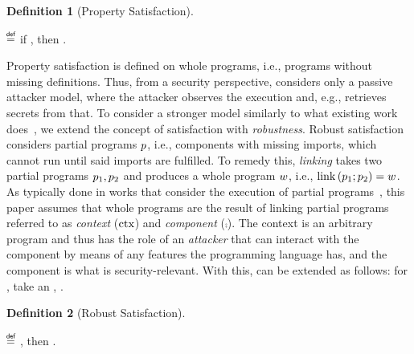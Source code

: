 \documentclass[dvipsnames,conference]{IEEEtran}
\theoremstyle{definition}
\newtheorem{definition}{Definition}[section]
\begin{document}
\begin{definition}[Property Satisfaction]\label{def:propsat}
$\;$ 

  \begin{nscenter}
    \bul{$\sat{\wholeprogvar}{\pi}$}
    $\isdef$
    if \iul{$\forall\runtimetermvar\ \trace,\progstepto{\wholeprogvar}{\runtimetermvar}{\trace}$},
    then \oul{$\trace\in\pi$}.
  \end{nscenter}
\end{definition}

Property satisfaction is defined on whole programs, i.e., programs without missing definitions.
Thus, from a security perspective,  considers only a passive attacker model, where the attacker observes the execution and, e.g., retrieves secrets from that.
To consider a stronger model similarly to what existing work does~\cite{abate2019jour,abate2021extacc,maffeis2008code-carrying,gordon2003authenticity,fournet2007authorization,bengtson2011refine,backes2014uniontyps,michael2023mswasm,swasey2017robust,sammler2019benefits}, we extend the concept of satisfaction with {\em robustness}.
Robust satisfaction considers partial programs $\progvar$, i.e., components with missing imports, which cannot run until said imports are fulfilled.
To remedy this, {\em linking} takes two partial programs $\progvar[_{1}],\progvar[_{2}]$ and produces a whole program $\wholeprogvar$, i.e., $\link{\progvar[_{1}]}{\progvar[_{2}]}=\wholeprogvar$.
As typically done in works that consider the execution of partial programs~\cite{abate2019jour,devriese2018parametricity,patrignani2021rsc,korashy2021capableptrs,strydonck2019lincap,devriese2017modular,bowman2015noninterference,ahmed2011equivcps,patterson2017linkingtyps},
this paper assumes that whole programs are the result of linking partial programs referred to as {\em context} ($\ctx$) and {\em component} ($\comp$).
The context is an arbitrary program and thus has the role of an {\em attacker} that can interact with the component by means of any features the programming language has, and the component is what is security-relevant.
With this,  can be extended as follows: for , take an , .

\begin{definition}[Robust Satisfaction]\label{def:proprsat}
  $\;$ 

  \begin{nscenter}
  \bul{$\rsat{\progvar}{\pi}$}
  $\isdef$ , then \oul{$\sat{\wholeprogvar}{\pi}$}.
  \end{nscenter}
\end{definition}
\end{document}
